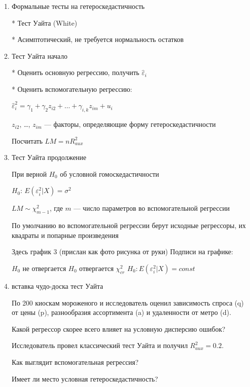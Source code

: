 \documentclass[12pt,a4paper]{article}
\begin{document}
{\begin{enumerate}
* Оцениваем интересующую нас модель с помощью МНК

* Строим график квадратов (или модулей) остатков в зависимости от регрессора

Тут графики 1 и 2 (присланы как png файлы)


\item Формальные тесты на гетероскедастичность

* Тест Уайта (White)

* Асимптотический, не требуется нормальность остатков

\item Тест Уайта  начало

* Оценить основную регрессию, получить $\hat{\varepsilon}_i$

* Оценить вспомогательную регрессию:

$\hat{\varepsilon}^2_i = \gamma_1 + \gamma_2 z_{i2} + \ldots + \gamma_{i,k} z_{im}+ u_i$

$z_{i2}$, \ldots, $z_{im}$ --- факторы, определяющие форму гетероскедастичности

Посчитать $LM=nR^2_{aux}$

\newpage
\item Тест Уайта продолжение

При верной $H_0$ об условной гомоскедастичности

$H_0$: $E(\varepsilon^2_i|X)=\sigma^2$

$LM \sim \chi^2_{m-1}$, где $m$ --- число параметров во вспомогательной регрессии

По умолчанию во вспомогательной регрессии берут исходные регрессоры, их квадраты и попарные произведения

Здесь график 3 (прислан как фото рисунка от руки)
Подписи на графике:

$H_0$ не отвергается
$H_0$ отвергается
$\chi^2_{cr}$
$H_0: E(\varepsilon_i^2 | X)=const$

\item вставка чудо-доска тест Уайта

По 200 киоскам мороженого и  исследователь оценил зависимость спроса (q) от цены (p), разнообразия ассортимента (a) и удаленности от метро (d).

Какой регрессор скорее всего влияет на условную дисперсию ошибок?

Исследователь провел классический тест Уайта и получил $R^2_{aux}=0.2$.

Как выглядит вспомогательная регрессия?

Имеет ли место условная гетероскедастичность?


\end{enumerate}}
\end{document}
